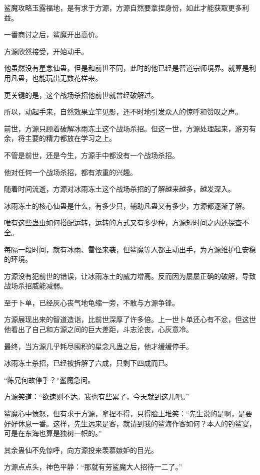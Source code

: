 \begin{this_body}
鲨魔攻略玉露福地，是有求于方源，方源自然要拿捏身份，如此才能获取更多利益。

一番商讨之后，鲨魔开出高价。

方源欣然接受，开始动手。

他虽然没有星念仙蛊，但是和前世不同，此时的他已经是智道宗师境界。就算是利用凡蛊，也能玩出无数花样来。

更关键的是，这个战场杀招他前世就曾经破解过。

所以，动起手来，自然效果立竿见影，还不时地引发众人的惊呼和赞叹之声。

前世，方源只顾着破解冰雨冻土这个战场杀招。但这一世，方源处理起来，游刃有余，将主要的精力都放在学习之上。

不管是前世，还是今生，方源手中都没有一个战场杀招。

他对任何一个战场杀招，都有浓重的兴趣。

随着时间流逝，方源对冰雨冻土这个战场杀招的了解越来越多，越发深入。

冰雨冻土的核心仙蛊是什么，有多少只，辅助凡蛊又有多少，方源都逐渐了解。

唯有这些蛊虫如何搭配运转，运转的方式又有多少种，方源短时间之内还探查不全。

每隔一段时间，就有冰雨、雪怪来袭，但鲨魔等人都主动出手，为方源维护住安稳的环境。

方源没有犯前世的错误，让冰雨冻土的威力增高。反而因为屡屡正确的破解，导致战场杀招威能减弱。

至于卜单，已经灰心丧气地龟缩一旁，不敢与方源争锋。

方源展现出来的智道造诣，比前世深厚了许多倍。上一世卜单还心有不忿，但这世他看出了自己和方源之间的巨大差距，斗志沦丧，心灰意冷。

最终，当方源几乎耗尽囤积的星念凡蛊之后，他才缓缓停手。

冰雨冻土杀招，已经被拆解了六成，只剩下四成而已。

“陈兄何故停手？”鲨魔急问。

方源笑道：“欲速则不达。我也有些累了，今天就到这儿吧。”

鲨魔心中愤怒，但有求于方源，拿捏不得，只得脸上堆笑：“先生说的是啊，是要好好休息一番。这样，先生远来是客，就请到我的鲨海作客如何？本人的钓鲨宴，可是在东海也算是独树一帜的。”

其余蛊仙不免惊呼，向方源投来羡慕嫉妒的目光。

方源点点头，神色平静：“那就有劳鲨魔大人招待一二了。”

\end{this_body}

